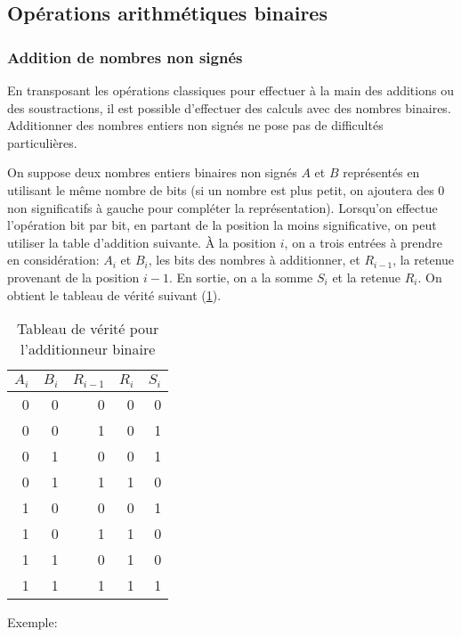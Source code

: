 \documentclass[11pt]{article}
\begin{document}
\subsection{Opérations arithmétiques binaires}
\label{sec:org281c642}

\subsubsection{Addition de nombres non signés}
\label{sec:orgf12d817}

En transposant les opérations classiques pour effectuer à la main des
additions ou des soustractions, il est possible d'effectuer des
calculs avec des nombres binaires. Additionner des nombres entiers non
signés ne pose pas de difficultés particulières.

On suppose deux nombres entiers binaires non signés \(A\) et \(B\)
représentés en utilisant le même nombre de bits (si un nombre est plus
petit, on ajoutera des 0 non significatifs à gauche pour compléter la
représentation). Lorsqu'on effectue l'opération bit par bit, en
partant de la position la moins significative, on peut utiliser la
table d'addition suivante. À la position \(i\), on a trois entrées à
prendre en considération: \(A_{i}\) et \(B_{i}\), les bits des nombres
à additionner, et \(R_{i-1}\), la retenue provenant de la position
\(i-1\). En sortie, on a la somme \(S_{i}\) et la retenue \(R_{i}\).
On obtient le tableau de vérité suivant (\ref{tab:org3643229}).

\begin{table}[htbp]
\caption{\label{tab:org3643229}Tableau de vérité pour l'additionneur binaire}
\centering
\begin{tabular}{rrrrr}
\(A_{i}\) & \(B_{i}\) & \(R_{i-1}\) & \(R_{i}\) & \(S_{i}\)\\[0pt]
\hline
0 & 0 & 0 & 0 & 0\\[0pt]
0 & 0 & 1 & 0 & 1\\[0pt]
0 & 1 & 0 & 0 & 1\\[0pt]
0 & 1 & 1 & 1 & 0\\[0pt]
1 & 0 & 0 & 0 & 1\\[0pt]
1 & 0 & 1 & 1 & 0\\[0pt]
1 & 1 & 0 & 1 & 0\\[0pt]
1 & 1 & 1 & 1 & 1\\[0pt]
\end{tabular}
\end{table}


Exemple:
\end{document}
